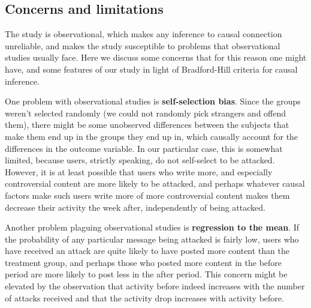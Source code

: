 \documentclass[
  10pt,
  dvipsnames]{scrartcl}
\begin{document}
\subsection{Concerns and limitations}

The study is observational, which makes any inference to causal
connection unreliable, and makes the study susceptible to problems that
observational studies usually face. Here we discuss some concerns that
for this reason one might have, and some features of our study in light
of Bradford-Hill criteria for causal inference.

One problem with observational studies is \textbf{self-selection bias}.
Since the groups weren't selected randomly (we could not randomly pick
strangers and offend them), there might be some unobserved differences
between the subjects that make them end up in the groups they end up in,
which causally account for the differences in the outcome variable. In
our particular case, this is somewhat limited, because users, strictly
speaking, do not self-select to be attacked. However, it is at least
possible that users who write more, and especially controversial content
are more likely to be attacked, and perhaps whatever causal factors make
such users write more of more controversial content makes them decrease
their activity the week after, independently of being attacked.

Another problem plaguing observational studies is
\textbf{regression to the mean}. If the probability of any particular
message being attacked is fairly low, users who have received an attack
are quite likely to have posted more content than the treatment group,
and perhaps those who posted more content in the \textsf{before} period
are more likely to post less in the \textsf{after} period. This concern
might be elevated by the observation that activity before indeed
increases with the number of attacks received and that the activity drop
increases with \textsf{activity} before.
\end{document}
